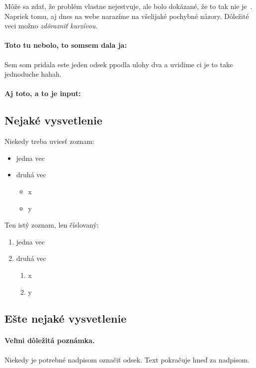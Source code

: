 \documentclass[10pt,twocolumn,twoside,slovak,a4paper]{coursepaper}
\begin{document}
Môže sa zdať, že problém vlastne nejestvuje\cite{Coplien:MPD}, ale bolo dokázané, že to tak nie je~\cite{Czarnecki:Staged, Czarnecki:Progress}. Napriek tomu, aj dnes na webe narazíme na všelijaké pochybné názory\cite{PLP-Framework}. Dôležité veci možno \emph{zdôrazniť kurzívou}.


\paragraph{Toto tu nebolo, to somsem dala ja:}
Sem som pridala este jeden odsek ppodla ulohy dva a uvidime ci je to take jednoduche hahah.

\paragraph{Aj toto, a to je input:}



\subsection{Nejaké vysvetlenie} \label{ina:nejake}

Niekedy treba uviesť zoznam:

\begin{itemize}
\item jedna vec
\item druhá vec
	\begin{itemize}
	\item x
	\item y
	\end{itemize}
\end{itemize}

Ten istý zoznam, len číslovaný:

\begin{enumerate}
\item jedna vec
\item druhá vec
	\begin{enumerate}
	\item x
	\item y
	\end{enumerate}
\end{enumerate}


\subsection{Ešte nejaké vysvetlenie} \label{ina:este}

\paragraph{Veľmi dôležitá poznámka.}
Niekedy je potrebné nadpisom označiť odsek. Text pokračuje hneď za nadpisom.
\end{document}
